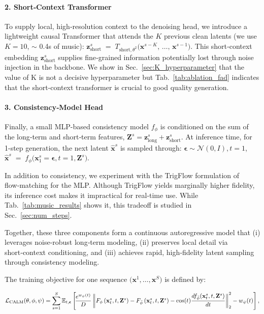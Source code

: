 \paragraph{2. Short‑Context Transformer}
To supply local, high‑resolution context to the denoising head, we introduce a lightweight causal Transformer that attends the $K$ previous clean latents (we use $K=10$, $\sim$ 0.4s of music): $\mathbf{z}_{\text{short}}^s \;=\; T_{\text{short}, \theta^2}\bigl(\mathbf{x}^{s-K},\,\ldots,\,\mathbf{x}^{s-1}\bigr)$.
This short‑context embedding $\mathbf{z}_{\text{short}}^s$ supplies fine‑grained information potentially lost through noise injection in the backbone. We show in Sec.~\ref{sec:K_hyperparameter} that the value of K is not a decisive hyperparameter but Tab.~\ref{tab:ablation_fad} indicates that the short-context transformer is crucial to good quality generation.


\paragraph{3. Consistency‑Model Head}
Finally, a small MLP-based consistency model $f_\phi$ is conditioned on the sum of the long‑term and short‑term features, $\mathbf{Z}^s = \mathbf{z}_{\text{long}}^s + \mathbf{z}_{\text{short}}^s$. At inference time, for 1-step generation, the next latent $\hat{\mathbf{x}}^s$ is sampled through: $\bm{\epsilon} \sim \mathcal{N}(0, I), t=1$, $\hat{\mathbf{x}}^s \;=\; f_\phi\bigl(\mathbf{x}^{s}_1 = \bm{\epsilon}, t=1, \mathbf{Z}^s\bigr)$.

In addition to consistency, we experiment with the TrigFlow \citep{continuous_consistency} formulation of flow‑matching for the MLP. Although TrigFlow yields marginally higher fidelity, its inference cost makes it impractical for real‑time use. While Tab.~\ref{tab:music_results} shows it, this tradeoff is studied in Sec.~\ref{sec:num_steps}.

Together, these three components form a continuous autoregressive model that (i) leverages noise‑robust long‑term modeling, (ii) preserves local detail via short‑context conditioning, and (iii) achieves rapid, high‑fidelity latent sampling through consistency modeling.  

The training objective for one sequence $\bigl(\mathbf{x}^1, \ldots, \mathbf{x}^S\bigr)$ is defined by:

\begin{equation}
\label{eq:objective_calm}
\small
    \mathcal{L}_{\text{CALM}}(\theta,\phi, \psi) = \sum_{s=1}^S\mathbb{E}_{t, \bm{\epsilon}}\left[\!
    \frac{e^{w_\psi(t)}}{D}\left\|
        F_\phi\left(\mathbf{x}^s_t,t, \mathbf{Z}^s\right) - F_{\bar{\phi}}\left(\mathbf{x}^s_t,t, \mathbf{Z}^s\right)
        - \cos(t)\frac{df_{\bar{\phi}}(\mathbf{x}^s_t,t, \mathbf{Z}^s)}{d t}
    \right\|_2^2 - w_\psi(t)
    \right],
\end{equation}

